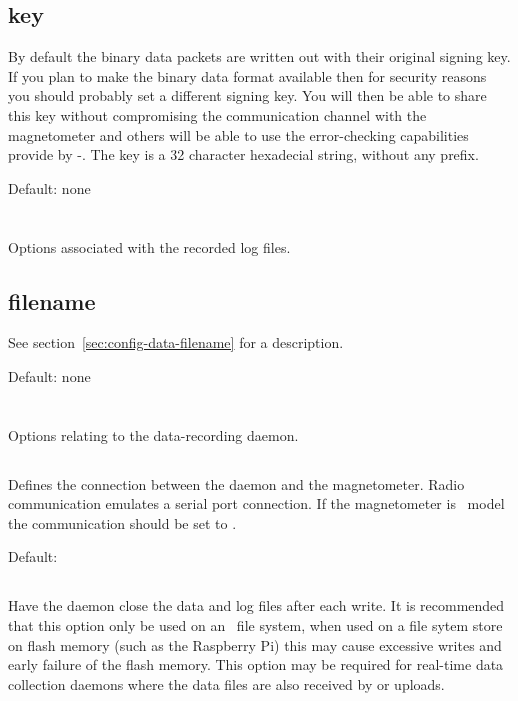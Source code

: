 \subsection{key}
By default the binary data packets are written out with their original
signing key. If you plan to make the binary data format available then
for security reasons you should probably set a different signing
key. You will then be able to share this key without compromising the
communication channel with the magnetometer and others will be able to
use the error-checking capabilities provide by \hmac-\mdfive. The key
is a 32 character hexadecial string, without any  prefix.

Default: none

\section{\code{[logfile]}}
Options associated with the recorded log files. 

\subsection{filename}

See section~\ref{sec:config-data-filename} for a description.

Default: none\\


\section{\code[daemon]}
Options relating to the data-recording daemon.

\subsection{}
Defines the connection between the daemon and the magnetometer. Radio
communication emulates a serial port connection. If the magnetometer
is \PoE\ model the communication should be set to .

Default: 

\subsection{}
Have the daemon close the data and log files after each write. It is
recommended that this option only be used on an \nfs\ file system,
when used on a file sytem store on flash memory (such as the Raspberry
Pi) this may cause excessive writes and early failure of the flash
memory. This option may be required for real-time data collection
daemons where the data files are also received by  or
 uploads.

